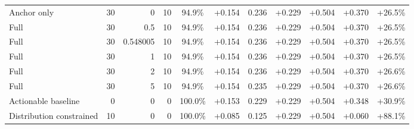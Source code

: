\begin{table}[htbp]
\begin{tabular}{lrrrccccccc}
Anchor only & 30 & 0 & 10 & 94.9\% & +0.154 & 0.236 & +0.229 & +0.504 & +0.370 & +26.5\% \\
Full & 30 & 0.5 & 10 & 94.9\% & +0.154 & 0.236 & +0.229 & +0.504 & +0.370 & +26.5\% \\
Full & 30 & 0.548005 & 10 & 94.9\% & +0.154 & 0.236 & +0.229 & +0.504 & +0.370 & +26.5\% \\
Full & 30 & 1 & 10 & 94.9\% & +0.154 & 0.236 & +0.229 & +0.504 & +0.370 & +26.5\% \\
Full & 30 & 2 & 10 & 94.9\% & +0.154 & 0.236 & +0.229 & +0.504 & +0.370 & +26.6\% \\
Full & 30 & 5 & 10 & 94.9\% & +0.154 & 0.235 & +0.229 & +0.504 & +0.370 & +26.6\% \\
Actionable baseline & 0 & 0 & 0 & 100.0\% & +0.153 & 0.229 & +0.229 & +0.504 & +0.348 & +30.9\% \\
Distribution constrained & 10 & 0 & 0 & 100.0\% & +0.085 & 0.125 & +0.229 & +0.504 & +0.060 & +88.1\% \\
\bottomrule
\end{tabular}
\end{table}